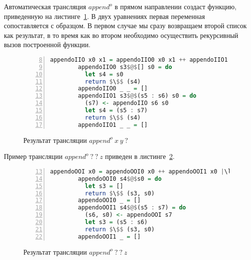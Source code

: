 Автоматическая трансляция $append^o$ в прямом направлении создаст функцию, приведенную на листинге~\ref{lst:appendoFWD}. 
В двух уравнениях первая переменная сопоставляется с образцом. 
В первом случае мы сразу возвращаем второй список как результат, в то время как во втором необходимо осуществить рекурсивный вызов построенной функции. 

\begin{figure}[h!]
  \begin{center}
  \begin{minipage}{0.7\textwidth}
  \begin{lstlisting}[language=Haskell, frame=single, numbers=left,numberstyle=\small, firstnumber=8, escapechar=|]
        appendoIIO x0 x1 = appendoIIO0 x0 x1 ++ appendoIIO1 x0 x1
        appendoIIO0 s3$@$[] s0 = do                                  |\label{line:appendoIIOTR2}|
          let s4 = s0
          return $\$$ (s4)
        appendoIIO0 _ _ = []                                         |\label{line:appendoIIOTR5}|
        appendoIIO1 s3$@$(s5 : s6) s0 = do                           |\label{line:appendoIIOTR6}|
          (s7) <- appendoIIO s6 s0
          let s4 = (s5 : s7)
          return $\$$ (s4)
        appendoIIO1 _ _ = []                                         |\label{line:appendoIIOTR10}|
  \end{lstlisting}
  \end{minipage}
  \end{center}
  \caption{Результат трансляции $append^o \ x \ y \ ?$}
  \label{lst:appendoFWD}
\end{figure}

Пример трансляции $append^o \ ? \ ? \ z$ приведен в листинге~\ref{lst:appendoBWD}.

\begin{figure}[h!]
  \begin{center}
  \begin{minipage}{0.7\textwidth}
    \begin{lstlisting}[language=Haskell, frame=single, numbers=left, numberstyle=\small, firstnumber=13, escapechar=|]
        appendoOOI x0 = appendoOOI0 x0 ++ appendoOOI1 x0 |\label{line:appendoOOITR1}|
        appendoOOI0 s4$@$s0 = do                         |\label{line:appendoOOITR2}|
          let s3 = []                                    |\label{line:appendoOOITR3}|
          return $\$$ (s3, s0)                           |\label{line:appendoOOITR4}|
        appendoOOI0 _ = []                               |\label{line:appendoOOITR5}|
        appendoOOI1 s4$@$(s5 : s7) = do                  |\label{line:appendoOOITR6}|
          (s6, s0) <- appendoOOI s7                      |\label{line:appendoOOITR7}|
          let s3 = (s5 : s6)                             |\label{line:appendoOOITR8}|
          return $\$$ (s3, s0)                           |\label{line:appendoOOITR9}|
        appendoOOI1 _ = []                               |\label{line:appendoOOITR10}|
      \end{lstlisting}
  \end{minipage}
  \end{center}
  \caption{Результат трансляции $append^o \ ? \ ? \ z$ }
  \label{lst:appendoBWD}
\end{figure}

